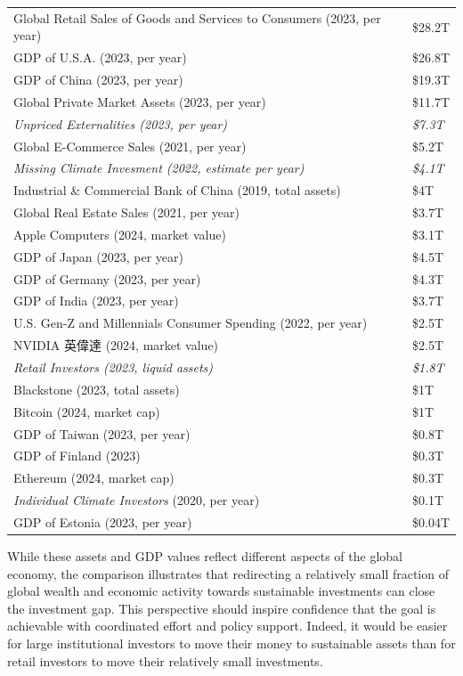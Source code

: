 \documentclass[
  12pt,
  letterpaper,
  DIV=11,
  numbers=noendperiod]{scrartcl}
\begin{document}
\begin{longtable}[]{@{}
  >{\raggedright\arraybackslash}p{}
  >{\raggedright\arraybackslash}p{}@{}}
Global Retail Sales of Goods and Services to Consumers (2023, per year)
& \$28.2T \\
GDP of U.S.A. (2023, per year) & \$26.8T \\
GDP of China (2023, per year) & \$19.3T \\
Global Private Market Assets (2023, per year) & \$11.7T \\
\emph{Unpriced Externalities (2023, per year)} & \emph{\$7.3T} \\
Global E-Commerce Sales (2021, per year) & \$5.2T \\
\emph{Missing Climate Invesment (2022, estimate per year)} &
\emph{\$4.1T} \\
Industrial \& Commercial Bank of China (2019, total assets) & \$4T \\
Global Real Estate Sales (2021, per year) & \$3.7T \\
Apple Computers (2024, market value) & \$3.1T \\
GDP of Japan (2023, per year) & \$4.5T \\
GDP of Germany (2023, per year) & \$4.3T \\
GDP of India (2023, per year) & \$3.7T \\
U.S. Gen-Z and Millennials Consumer Spending (2022, per year) &
\$2.5T \\
NVIDIA 英偉達 (2024, market value) & \$2.5T \\
\emph{Retail Investors (2023, liquid assets)} & \emph{\$1.8T} \\
Blackstone (2023, total assets) & \$1T \\
Bitcoin (2024, market cap) & \$1T \\
GDP of Taiwan (2023, per year) & \$0.8T \\
GDP of Finland (2023) & \$0.3T \\
Ethereum (2024, market cap) & \$0.3T \\
\emph{Individual Climate Investors} (2020, per year) & \$0.1T \\
GDP of Estonia (2023, per year) & \$0.04T \\
\end{longtable}

\let\pandoctableshortcapt\relax

While these assets and GDP values reflect different aspects of the
global economy, the comparison illustrates that redirecting a relatively
small fraction of global wealth and economic activity towards
sustainable investments can close the investment gap. This perspective
should inspire confidence that the goal is achievable with coordinated
effort and policy support. Indeed, it would be easier for large
institutional investors to move their money to sustainable assets than
for retail investors to move their relatively small investments.
\end{document}
